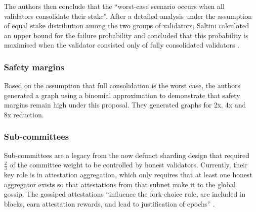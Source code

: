 \documentclass{article}
\begin{document}
The authors then conclude that the ``worst-case scenario occurs when all
validators consolidate their stake''. After a detailed analysis under the
assumption of equal stake distribution among the two groups of validators,
Saltini calculated an upper bound for the failure probability and concluded
that this probability is maximised when the validator consisted only of fully
consolidated validators \cite{Saltini2023}.


\subsubsection*{Safety margins}
Based on the assumption that full consolidation is the worst case, the authors
generated a graph using a binomial approximation to demonstrate that safety
margins remain high under this proposal. They generated graphs for 2x, 4x and
8x reduction.

\subsubsection*{Sub-committees}
Sub-committees are a legacy from the now defunct sharding design that required
$\frac{2}{3}$ of the committee weight to be controlled by honest validators.
Currently, their key role is in attestation aggregation, which only requires
that at least one honest aggregator exists so that attestations from that
subnet make it to the global gossip. The gossiped attestations ``influence the
fork-choice rule, are included in blocks, earn attestation rewards, and lead to
justification of epochs''  \cite{damato2023}.
\end{document}
